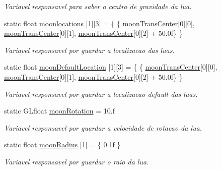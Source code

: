 \begin{DoxyCompactItemize}
\begin{DoxyCompactList}\small\item\em Variavel responsavel para saber o centro de gravidade da lua. \end{DoxyCompactList}\item 
static float \mbox{\hyperlink{class_scene_texture_a1b2d81b63010dd6d8ec1022e097eb7c3}{moonlocations}} \mbox{[}1\mbox{]}\mbox{[}3\mbox{]} = \{ \{ \mbox{\hyperlink{class_scene_texture_a116f1f15f385d94dee75092b2feaa20c}{moon\+Trans\+Center}}\mbox{[}0\mbox{]}\mbox{[}0\mbox{]}, \mbox{\hyperlink{class_scene_texture_a116f1f15f385d94dee75092b2feaa20c}{moon\+Trans\+Center}}\mbox{[}0\mbox{]}\mbox{[}1\mbox{]}, \mbox{\hyperlink{class_scene_texture_a116f1f15f385d94dee75092b2feaa20c}{moon\+Trans\+Center}}\mbox{[}0\mbox{]}\mbox{[}2\mbox{]} + 50.\+0f\} \}
\begin{DoxyCompactList}\small\item\em Variavel responsavel por guardar a localizacao das luas. \end{DoxyCompactList}\item 
static float \mbox{\hyperlink{class_scene_texture_ae53e83f7c540d834710356dc43b991f3}{moon\+Default\+Location}} \mbox{[}1\mbox{]}\mbox{[}3\mbox{]} = \{ \{ \mbox{\hyperlink{class_scene_texture_a116f1f15f385d94dee75092b2feaa20c}{moon\+Trans\+Center}}\mbox{[}0\mbox{]}\mbox{[}0\mbox{]}, \mbox{\hyperlink{class_scene_texture_a116f1f15f385d94dee75092b2feaa20c}{moon\+Trans\+Center}}\mbox{[}0\mbox{]}\mbox{[}1\mbox{]}, \mbox{\hyperlink{class_scene_texture_a116f1f15f385d94dee75092b2feaa20c}{moon\+Trans\+Center}}\mbox{[}0\mbox{]}\mbox{[}2\mbox{]} + 50.\+0f\} \}
\begin{DoxyCompactList}\small\item\em Variavel responsavel por guardar a localizacao default das luas. \end{DoxyCompactList}\item 
static G\+Lfloat \mbox{\hyperlink{class_scene_texture_a867c1b5be3195fe900a403722b170036}{moon\+Rotation}} = 10.f
\begin{DoxyCompactList}\small\item\em Variavel responsavel por guardar a velocidade de rotacao da lua. \end{DoxyCompactList}\item 
static float \mbox{\hyperlink{class_scene_texture_ac301828f6b86e80a798ae0531c349c63}{moon\+Radius}} \mbox{[}1\mbox{]} = \{ 0.\+1f \}
\begin{DoxyCompactList}\small\item\em Variavel responsavel por guardar o raio da lua. \end{DoxyCompactList}\item 

\end{DoxyCompactItemize}
